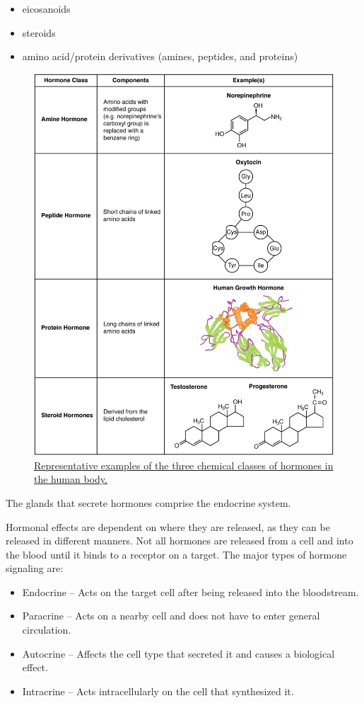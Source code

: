 \begin{itemize}
\tightlist
\item
  eicosanoids
\item
  steroids
\item
  amino acid/protein derivatives (amines, peptides, and proteins)
\end{itemize}



\begin{figure}

{\centering \includegraphics[width=0.7\linewidth]{./figures/endocrine/1802_Examples_of_Amine_Peptide_Protein_and_Steroid_Hormone_Structure} 

}

\caption{\href{https://commons.wikimedia.org/wiki/File:1802_Examples_of_Amine_Peptide_Protein_and_Steroid_Hormone_Structure.jpg}{Representative examples of the three chemical classes of hormones in the human body.}}\label{fig:hormoneexamples}
\end{figure}

The glands that secrete hormones comprise the endocrine system.

Hormonal effects are dependent on where they are released, as they can be released in different manners. Not all hormones are released from a cell and into the blood until it binds to a receptor on a target. The major types of hormone signaling are:

\begin{itemize}
\tightlist
\item
  Endocrine -- Acts on the target cell after being released into the bloodstream.
\item
  Paracrine -- Acts on a nearby cell and does not have to enter general circulation.
\item
  Autocrine -- Affects the cell type that secreted it and causes a biological effect.
\item
  Intracrine -- Acts intracellularly on the cell that synthesized it.
\end{itemize}

